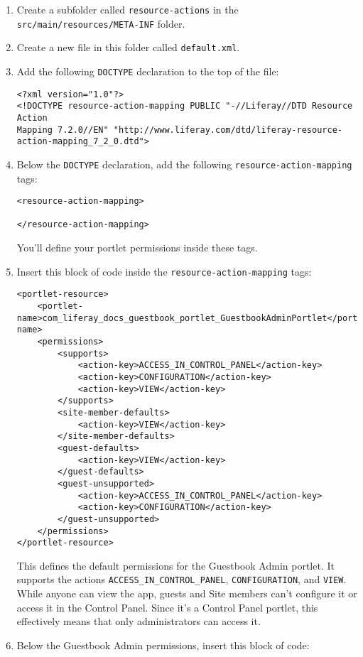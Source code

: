 \begin{enumerate}
\def\labelenumi{\arabic{enumi}.}
\item
  Create a subfolder called \texttt{resource-actions} in the
  \texttt{src/main/resources/META-INF} folder.
\item
  Create a new file in this folder called \texttt{default.xml}.
\item
  Add the following \texttt{DOCTYPE} declaration to the top of the file:

\begin{verbatim}
<?xml version="1.0"?>
<!DOCTYPE resource-action-mapping PUBLIC "-//Liferay//DTD Resource Action  
Mapping 7.2.0//EN" "http://www.liferay.com/dtd/liferay-resource-action-mapping_7_2_0.dtd">
\end{verbatim}
\item
  Below the \texttt{DOCTYPE} declaration, add the following
  \texttt{resource-action-mapping} tags:

\begin{verbatim}
<resource-action-mapping>

</resource-action-mapping>
\end{verbatim}

  You'll define your portlet permissions inside these tags.
\item
  Insert this block of code inside the \texttt{resource-action-mapping}
  tags:

\begin{verbatim}
<portlet-resource>
    <portlet-name>com_liferay_docs_guestbook_portlet_GuestbookAdminPortlet</portlet-name>
    <permissions>
        <supports>
            <action-key>ACCESS_IN_CONTROL_PANEL</action-key>
            <action-key>CONFIGURATION</action-key>
            <action-key>VIEW</action-key>
        </supports>
        <site-member-defaults>
            <action-key>VIEW</action-key>
        </site-member-defaults>
        <guest-defaults>
            <action-key>VIEW</action-key>
        </guest-defaults>
        <guest-unsupported>
            <action-key>ACCESS_IN_CONTROL_PANEL</action-key>
            <action-key>CONFIGURATION</action-key>
        </guest-unsupported>
    </permissions>
</portlet-resource>
\end{verbatim}

  This defines the default permissions for the Guestbook Admin portlet.
  It supports the actions \texttt{ACCESS\_IN\_CONTROL\_PANEL},
  \texttt{CONFIGURATION}, and \texttt{VIEW}. While anyone can view the
  app, guests and Site members can't configure it or access it in the
  Control Panel. Since it's a Control Panel portlet, this effectively
  means that only administrators can access it.
\item
  Below the Guestbook Admin permissions, insert this block of code:


\end{enumerate}
